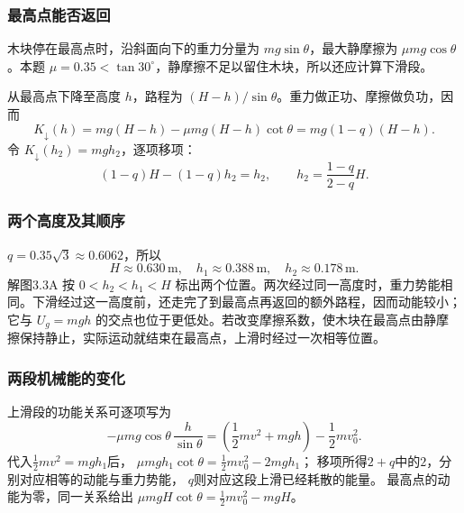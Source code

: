 \documentclass[UTF8,fontset=fandol,a4paper,11pt]{ctexart}
\begin{document}
\subsubsection*{最高点能否返回}
木块停在最高点时，沿斜面向下的重力分量为 $mg\sin\theta$，最大静摩擦为 $\mu mg\cos\theta$。本题 $\mu=0.35<\tan30^\circ$，静摩擦不足以留住木块，所以还应计算下滑段。

从最高点下降至高度 $h$，路程为 $(H-h)/\sin\theta$。重力做正功、摩擦做负功，因而
\[
K_{\downarrow}(h)=mg(H-h)-\mu mg(H-h)\cot\theta
=mg(1-q)(H-h).
\]
令 $K_{\downarrow}(h_2)=mgh_2$，逐项移项：
\[
(1-q)H-(1-q)h_2=h_2,\qquad
\boxed{h_2=\frac{1-q}{2-q}H}.
\]

\subsubsection*{两个高度及其顺序}
$q=0.35\sqrt3\approx0.6062$，所以
\[
H\approx0.630\,\mathrm m,\quad
\boxed{h_1\approx0.388\,\mathrm m,\quad h_2\approx0.178\,\mathrm m}.
\]
解图3.3A 按 $0<h_2<h_1<H$ 标出两个位置。两次经过同一高度时，重力势能相同。下滑经过这一高度前，还走完了到最高点再返回的额外路程，因而动能较小；它与 $U_g=mgh$ 的交点也位于更低处。若改变摩擦系数，使木块在最高点由静摩擦保持静止，实际运动就结束在最高点，上滑时经过一次相等位置。
\subsubsection*{两段机械能的变化}
上滑段的功能关系可逐项写为
\[
-\mu mg\cos\theta\,\frac h{\sin\theta}
=\left(\frac12mv^2+mgh\right)-\frac12mv_0^2.
\]
代入$\frac12mv^2=mgh_1$后，
$\mu mgh_1\cot\theta=\frac12mv_0^2-2mgh_1$；
移项所得$2+q$中的$2$，分别对应相等的动能与重力势能，
$q$则对应这段上滑已经耗散的能量。
最高点的动能为零，同一关系给出
$\mu mgH\cot\theta=\frac12mv_0^2-mgH$。
\end{document}
